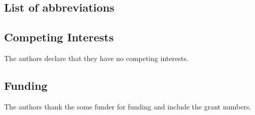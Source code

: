 \documentclass[a4paper,num-refs,numbers,sort&compress]{de-rse}
\begin{document}
\subsection{List of abbreviations}\label{subsec:glossary}

\printglossaries



\subsection{Competing Interests}
The authors declare that they have no competing interests.



\subsection{Funding}
The authors thank the some funder for funding and include the grant numbers.

\end{document}
